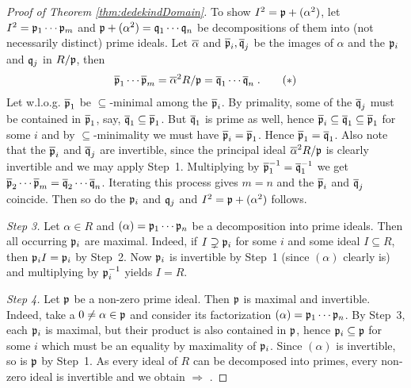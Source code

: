 \documentclass[a4paper,parskip=half,numbers=enddot, DIV=12, headheight=30pt]{scrreprt}
\begin{document}
\begin{proof}[Proof of Theorem \ref{thm:dedekindDomain}]
To show $I^2=\mathfrak{p}+(\alpha^2)$, let $I^2=\mathfrak{p}_1\cdots \mathfrak{p}_m$ and $\mathfrak{p}+(\alpha^2)=\mathfrak{q}_1\cdots\mathfrak{q}_n$ be decompositions of them into (not necessarily distinct) prime ideals. Let $\overline \alpha$ and $\overline{\mathfrak{p}}_i,\overline{\mathfrak{q}}_j$ be the images of $\alpha$ and the $\mathfrak{p}_i$ and $\mathfrak{q}_j$ in $R/\mathfrak{p}$, then
\begin{align}\lbl{eq:decompInR/p}
	\ov \pp_1\cdots \ov \pp_m=\ov \alpha^2R/\pp=\ov \qq_1\cdots\ov \qq_n\;.\tag{$*$}
\end{align}
Let w.l.o.g. $\overline {\mathfrak{p}}_1$ be $\subseteq$-minimal among the $\overline {\mathfrak{p}}_i$. By primality, some of the $\overline {\mathfrak{q}}_j$ must be contained in $\overline {\mathfrak{p}}_1$, say, $\overline {\mathfrak{q}}_1\subseteq \overline {\mathfrak{p}}_1$. But $\overline {\mathfrak{q}}_1$ is prime as well, hence $\overline {\mathfrak{p}}_i\subseteq \overline {\mathfrak{q}}_1\subseteq \overline {\mathfrak{p}}_1$ for some $i$ and by $\subseteq$-minimality we must have $\overline {\mathfrak{p}}_i=\overline {\mathfrak{p}}_1$. Hence $\overline {\mathfrak{p}}_1=\overline {\mathfrak{q}}_1$. Also note that the $\overline {\mathfrak{p}}_i$ and $\overline {\mathfrak{q}}_j$ are invertible, since the principal ideal $\overline \alpha^2R/\mathfrak{p}$ is clearly invertible and we may apply Step~1. Multiplying  by $\overline {\mathfrak{p}}_1^{-1}=\overline {\mathfrak{q}}_1^{-1}$ we get $\overline {\mathfrak{p}}_2\cdots \overline {\mathfrak{p}}_m=\overline {\mathfrak{q}}_2\cdots \overline {\mathfrak{q}}_n$. Iterating this process gives $m=n$ and the $\overline {\mathfrak{p}}_i$ and $\overline {\mathfrak{q}}_j$ coincide. Then so do the $\mathfrak{p}_i$ and $\mathfrak{q}_j$ and $I^2=\mathfrak{p}+(\alpha^2)$ follows.

\emph{Step 3.} Let $\alpha\in R$ and $(\alpha)=\mathfrak{p}_1\cdots \mathfrak{p}_n$ be a decomposition into prime ideals. Then all occurring $\mathfrak{p}_i$ are maximal. Indeed, if $I\supsetneq \mathfrak{p}_i$ for some $i$ and some ideal $I\subseteq R$, then $\mathfrak{p}_iI=\mathfrak{p}_i$ by Step~2. Now $\mathfrak{p}_i$ is invertible by Step~1 (since $(\alpha)$ clearly is) and multiplying by $\mathfrak{p}_i^{-1}$ yields $I=R$.

\emph{Step 4.} Let $\mathfrak{p}$ be a non-zero prime ideal. Then $\mathfrak{p}$ is maximal and invertible. Indeed, take a $0\neq \alpha\in\mathfrak{p}$ and consider its factorization $(\alpha)=\mathfrak{p}_1\cdots \mathfrak{p}_n$. By Step~3, each $\mathfrak{p}_i$ is maximal, but their product is also contained in $\mathfrak{p}$, hence $\mathfrak{p}_i\subseteq\mathfrak{p}$ for some $i$ which must be an equality by maximality of $\mathfrak{p}_i$. Since $(\alpha)$ is invertible, so is $\mathfrak{p}$ by Step~1. As every ideal of $R$ can be decomposed into primes, every non-zero ideal is invertible and we obtain  $\Rightarrow$ .
\end{proof}
\end{document}
